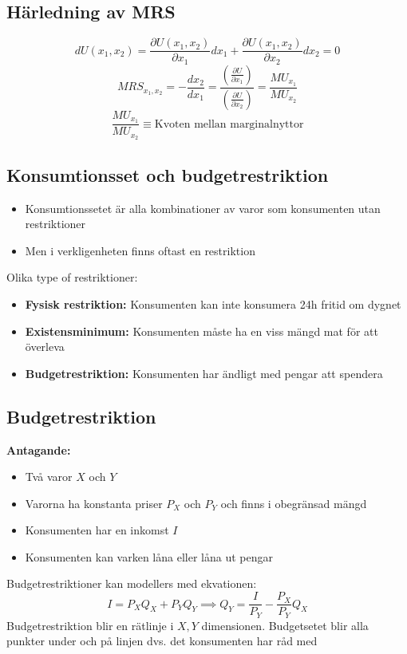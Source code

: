 \documentclass[12pt,a4paper]{article}
\begin{document}
{\subsection*{Härledning av MRS}
$$dU(x_1, x_2) = \frac{\partial U(x_1,x_2)}{\partial x_1}dx_1 + \frac{\partial U(x_1,x_2)}{\partial x_2}dx_2 = 0$$
$$MRS_{x_1,x_2} = -\frac{dx_2}{dx_1} = \frac{(\frac{\partial U}{\partial x_1})}{(\frac{\partial U}{\partial x_2})} = \frac{MU_{x_1}}{MU_{x_2}}$$
$$\frac{MU_{x_1}}{MU_{x_2}} \equiv \text{Kvoten mellan marginalnyttor}$$

\subsection*{Konsumtionsset och budgetrestriktion}
\begin{itemize}
    \item Konsumtionssetet är alla kombinationer av varor som konsumenten utan restriktioner 
    \item Men i verkligenheten finns oftast en restriktion
\end{itemize}

Olika type of restriktioner:
\begin{itemize}
    \item \textbf{Fysisk restriktion:} Konsumenten kan inte konsumera 24h fritid om dygnet
    \item \textbf{Existensminimum:} Konsumenten måste ha en viss mängd mat för att överleva
    \item \textbf{Budgetrestriktion:} Konsumenten har ändligt med pengar att spendera
\end{itemize}

\subsection*{Budgetrestriktion}
\textbf{Antagande:}
\begin{itemize}
    \item Två varor $X$ och $Y$
    \item Varorna ha konstanta priser $P_X$ och $P_Y$ och finns i obegränsad mängd
    \item Konsumenten har en inkomst $I$
    \item Konsumenten kan varken låna eller låna ut pengar
\end{itemize}
Budgetrestriktioner kan modellers med ekvationen:
$$I = P_X Q_X + P_Y Q_Y \implies Q_Y = \frac{I}{P_Y} - \frac{P_X}{P_Y}Q_X$$
Budgetrestriktion blir en rätlinje i $X, Y$ dimensionen. 
Budgetsetet blir alla punkter under och på linjen dvs. det konsumenten har råd med 

}
\end{document}
